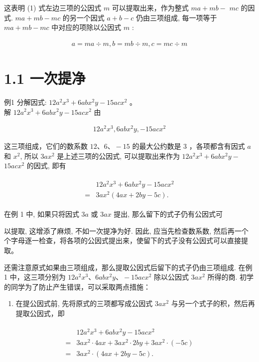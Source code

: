\documentclass[10pt]{article}
\begin{document}
这表明 (1) 式左边三项的公因式 $m$ 可以提取出来，作为整式 $m a+m b-$ $m c$ 的因式. $m a+m b-m c$ 的另一个因式 $a+b-c$ 仍由三项组成, 每一项等于 $m a+m b-m c$ 中对应的项除以公因式 $m$ :

\begin{align*}
a=m a \div m, b=m b \div m, c=m c \div m
\end{align*}

\section*{1.1 一次提净}
例1 分解因式: $12 a^{2} x^{3}+6 a b x^{2} y-15 a c x^{2}$ 。\\
解 $12 a^{2} x^{3}+6 a b x^{2} y-15 a c x^{2}$ 由

\begin{align*}
12 a^{2} x^{3}, 6 a b x^{2} y,-15 a c x^{2}
\end{align*}

这三项组成，它们的数系数 $12 、 6 、-15$ 的最大公约数是 3 ，各项都含有因式 $a$和 $x^{2}$, 所以 $3 a x^{2}$ 是上述三项的公因式, 可以提取出来作为 $12 a^{2} x^{3}+6 a b x^{2} y-$ $15 a c x^{2}$ 的因式, 即有

\begin{align*}
\begin{aligned}
& 12 a^{2} x^{3}+6 a b x^{2} y-15 a c x^{2} \\
= & 3 a x^{2}(4 a x+2 b y-5 c) .
\end{aligned}
\end{align*}

在例 1 中, 如果只将因式 $3 a$ 或 $3 a x$ 提出, 那么留下的式子仍有公因式可

以提取, 这增添了麻烦, 不如一次提净为好. 因此, 应当先检查数系数, 然后再一个个字母逐一检查，将各项的公因式提出来，使留下的式子没有公因式可以直接提取。

还需注意原式如果由三项组成，那么提取公因式后留下的式子仍由三项组成. 在例1 中，这三项分别为 $12 a^{2} x^{3} 、 6 a b x^{2} y 、-15 a c x^{2}$ 除以公因式 $3 a x^{2}$ 所得的商. 初学的同学为了防止产生错误，可以采取两点措施：

\begin{enumerate}
  \item 在提公因式前, 先将原式的三项都写成公因式 $3 a x^{2}$ 与另一个式子的积，然后再提取公因式，即
\end{enumerate}

\begin{align*}
\begin{aligned}
& 12 a^{2} x^{3}+6 a b x^{2} y-15 a c x^{2} \\
= & 3 a x^{2} \cdot 4 a x+3 a x^{2} \cdot 2 b y+3 a x^{2} \cdot(-5 c) \\
= & 3 a x^{2} \cdot(4 a x+2 b y-5 c) .
\end{aligned}
\end{align*}
\end{document}
